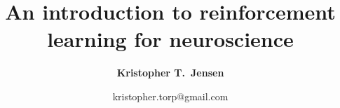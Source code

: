 
\usepackage{graphicx} %
\usepackage[compress]{natbib}
\usepackage[resetlabels]{multibib}

\usepackage{url}            %
\usepackage{float}
\usepackage[table]{xcolor}

\usepackage{caption}
\usepackage{subcaption}
\usepackage{amsmath,amssymb,bm}
\usepackage{multicol}
\usepackage{lineno}
\usepackage{authblk}

\usepackage[colorlinks=true, linkcolor=dblue, citecolor=dred]{hyperref}       %

\usepackage[nameinlink]{cleveref}
\usepackage[margin=1in]{geometry}
\renewcommand\b\bm
\setlength{\parindent}{0pt}
\setlength{\parskip  }{5.5pt}
\setlength\columnsep{30pt}
\setlength\footnotesep{15pt}

\title{An introduction to reinforcement learning for neuroscience \vspace{0.5em}}

\author[1,2]{\normalsize \bfseries Kristopher T.\ Jensen}
\date{\vspace*{-1.5em}
\normalsize kristopher.torp@gmail.com
}
